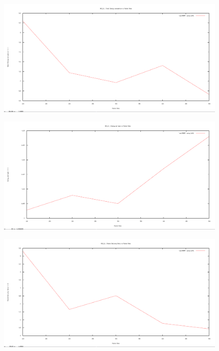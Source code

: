 \documentclass[12pt]{article}
\begin{document}
\begin{figure}[H]
	\centering
	\includegraphics[scale=	0.26]{image/802.15.4/Energyconsumption_vs_packetRates.png}
\end{figure}

\begin{figure}[H]
	\centering
	\includegraphics[scale=	0.26]{image/802.15.4/Energyperbytes_vs_packetRates.png}
\end{figure}

\begin{figure}[H]
	\centering
	\includegraphics[scale=	0.26]{image/802.15.4/Packetdeliveryratio_vs_packetRates.png}
\end{figure}
\end{document}
